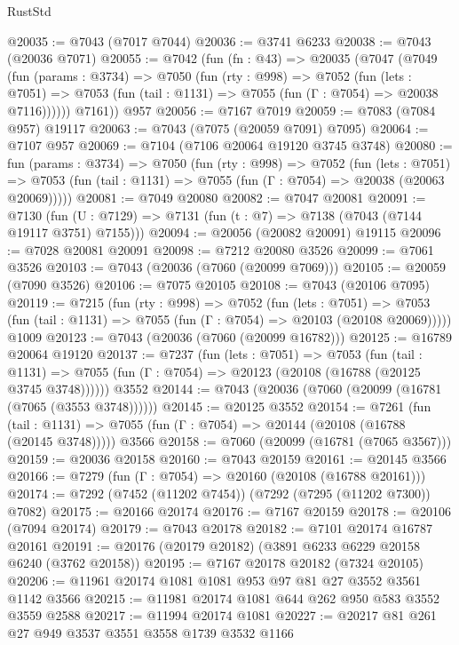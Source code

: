 \begin{lexlean}{RustStd}
\begin{coremodule}
@20035 := @7043 (@7017 @7044)
@20036 := @3741 @6233
@20038 := @7043 (@20036 @7071)
@20055 := @7042
    (fun (fn : @43) =>
    @20035
      (@7047
        (@7049
          (fun (params : @3734) =>
          @7050
            (fun (rty : @998) =>
            @7052
              (fun (lets : @7051) =>
              @7053 (fun (tail : @1131) => @7055 (fun (Γ : @7054) => @20038 @7116))))))
        @7161))
    @957
@20056 := @7167 @7019
@20059 := @7083 (@7084 @957) @19117
@20063 := @7043 (@7075 (@20059 @7091) @7095)
@20064 := @7107 @957
@20069 := @7104 (@7106 @20064 @19120 @3745 @3748)
@20080 := fun (params : @3734) =>
  @7050
    (fun (rty : @998) =>
    @7052
      (fun (lets : @7051) =>
      @7053 (fun (tail : @1131) => @7055 (fun (Γ : @7054) => @20038 (@20063 @20069)))))
@20081 := @7049 @20080
@20082 := @7047 @20081
@20091 := @7130
    (fun (U : @7129) => @7131 (fun (t : @7) => @7138 (@7043 (@7144 @19117 @3751) @7155)))
@20094 := @20056 (@20082 @20091) @19115
@20096 := @7028 @20081 @20091
@20098 := @7212 @20080 @3526
@20099 := @7061 @3526
@20103 := @7043 (@20036 (@7060 (@20099 @7069)))
@20105 := @20059 (@7090 @3526)
@20106 := @7075 @20105
@20108 := @7043 (@20106 @7095)
@20119 := @7215
    (fun (rty : @998) =>
    @7052
      (fun (lets : @7051) =>
      @7053 (fun (tail : @1131) => @7055 (fun (Γ : @7054) => @20103 (@20108 @20069)))))
    @1009
@20123 := @7043 (@20036 (@7060 (@20099 @16782)))
@20125 := @16789 @20064 @19120
@20137 := @7237
    (fun (lets : @7051) =>
    @7053
      (fun (tail : @1131) =>
      @7055 (fun (Γ : @7054) => @20123 (@20108 (@16788 (@20125 @3745 @3748))))))
    @3552
@20144 := @7043 (@20036 (@7060 (@20099 (@16781 (@7065 (@3553 @3748))))))
@20145 := @20125 @3552
@20154 := @7261
    (fun (tail : @1131) => @7055 (fun (Γ : @7054) => @20144 (@20108 (@16788 (@20145 @3748)))))
    @3566
@20158 := @7060 (@20099 (@16781 (@7065 @3567)))
@20159 := @20036 @20158
@20160 := @7043 @20159
@20161 := @20145 @3566
@20166 := @7279 (fun (Γ : @7054) => @20160 (@20108 (@16788 @20161)))
@20174 := @7292 (@7452 (@11202 @7454)) (@7292 (@7295 (@11202 @7300)) @7082)
@20175 := @20166 @20174
@20176 := @7167 @20159
@20178 := @20106 (@7094 @20174)
@20179 := @7043 @20178
@20182 := @7101 @20174 @16787 @20161
@20191 := @20176 (@20179 @20182) (@3891 @6233 @6229 @20158 @6240 (@3762 @20158))
@20195 := @7167 @20178 @20182 (@7324 @20105)
@20206 := @11961 @20174 @1081 @1081 @953 @97 @81 @27 @3552 @3561 @1142 @3566
@20215 := @11981 @20174 @1081 @644 @262 @950 @583 @3552 @3559 @2588
@20217 := @11994 @20174 @1081
@20227 := @20217 @81 @261 @27 @949 @3537 @3551 @3558 @1739 @3532 @1166

\end{coremodule}
\end{lexlean}
